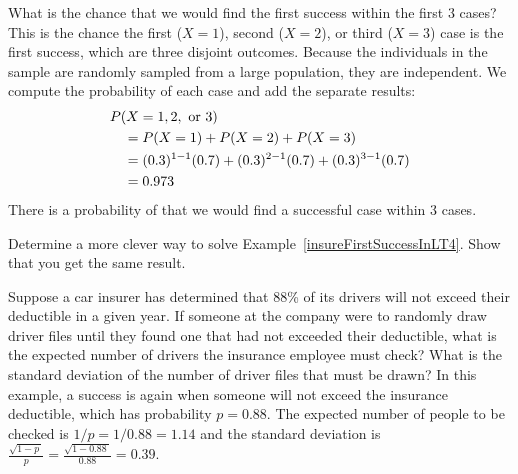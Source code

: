 \begin{examplewrap}
\begin{nexample}{What is the chance that we would find
    the first success within the first 3 cases?}
  \label{insureFirstSuccessInLT4}%
  This is the chance the first ($X=1$), second ($X=2$),
  or third ($X=3$) case is the first success, which are three
  disjoint outcomes.
  Because the individuals in the sample are randomly sampled
  from a large population, they are independent.
  We compute the probability of each case and add the separate
  results:
  \begin{align*}
  &P(X=1, 2, \text{ or }3) \\
    & \quad = P(X=1)+P(X=2)+P(X=3) \\
    & \quad = (0.3{})^{1-1}(0.7{})
        + (0.3{})^{2-1}(0.7{})
        + (0.3{})^{3-1}(0.7{}) \\
    & \quad = 0.973{}
  \end{align*}
  There is a probability of \insureCDistC{} that we would
  find a successful case within 3 cases.
\end{nexample}
\end{examplewrap}

\begin{exercisewrap}
\begin{nexercise}
Determine a more clever way to solve Example~\ref{insureFirstSuccessInLT4}.
Show that you get the same result.\footnotemark{}
\end{nexercise}
\end{exercisewrap}

\D{\newpage}

\begin{examplewrap}
\begin{nexample}{Suppose a car insurer has determined
    that 88\% of its drivers will not exceed their deductible
    in a given year.
    If someone at the company were to randomly draw
    driver files until they found one that had not exceeded
    their deductible, what is the expected number of drivers
    the insurance employee must check?
    What is the standard deviation of the number of driver files
    that must be drawn?}
  \label{carInsure08DrawOne}%
  In this example, a success is again when someone will not
  exceed the insurance deductible, which has probability
  $p = 0.88$.
  The expected number of people to be checked is
  $1 / p = 1 / 0.88 = 1.14$ and the standard deviation is
  $\frac{\sqrt{1-p\ }}{p}=\frac{\sqrt{1-0.88\ }}{0.88} = 0.39$.
\end{nexample}
\end{examplewrap}


